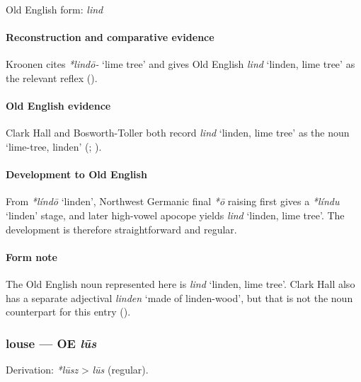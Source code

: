 \documentclass[
  british,
  a4paper,
]{article}
\providecommand{\Recon}[1]{\emph{*#1}}
\begin{document}
Old English form: \emph{lind}

\paragraph{Reconstruction and comparative
evidence}\label{reconstruction-and-comparative-evidence-40}

Kroonen cites \emph{*lindō-} `lime tree' and gives Old English
{\emph{lind}} `linden, lime tree' as the relevant reflex
().

\paragraph{Old English evidence}\label{old-english-evidence-40}

Clark Hall and Bosworth-Toller both record {\emph{lind}} `linden, lime
tree' as the noun `lime-tree, linden'
(;
).

\paragraph{Development to Old
English}\label{development-to-old-english-40}

From \Recon{líndō} `linden', Northwest Germanic final \emph{*ō} raising
first gives a \Recon{líndu} `linden' stage, and later high-vowel apocope
yields {\emph{lind}} `linden, lime tree'. The development is therefore
straightforward and regular.

\paragraph{Form note}\label{form-note-12}

The Old English noun represented here is {\emph{lind}} `linden, lime
tree'. Clark Hall also has a separate adjectival \emph{linden} `made of
linden-wood', but that is not the noun counterpart for this entry
().

\subsubsection{\texorpdfstring{louse --- OE
\emph{lūs}}{louse --- OE lūs}}\label{louse-oe-lux16bs}

Derivation: \emph{*lūsz} \textgreater{} \emph{lūs} (regular).
\end{document}
